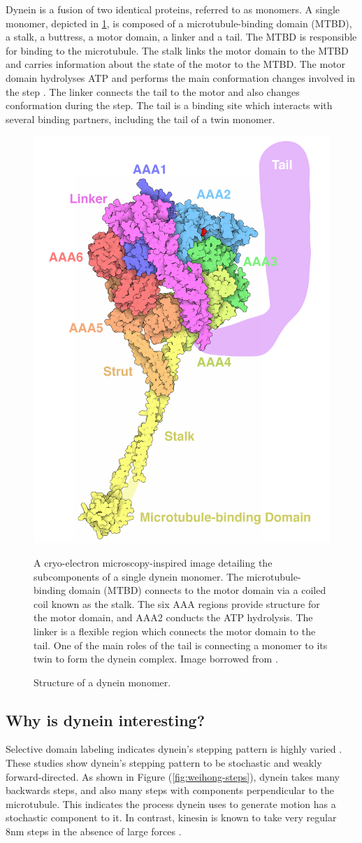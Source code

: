 \documentclass[
11pt, %
english, %
singlespacing, %
headsepline, %
chapterinoneline, %
]{MastersDoctoralThesis} %
\begin{document}
Dynein is a fusion of two identical proteins, referred to as monomers. A single monomer, depicted in \ref{fig:pdb-motm-dynein}, is composed of a microtubule-binding domain (MTBD), a stalk, a buttress, a motor domain, a linker and a tail. The MTBD is responsible for binding to the microtubule. The stalk links the motor domain to the MTBD and carries information about the state of the motor to the MTBD. The motor domain hydrolyses ATP and performs the main conformation changes involved in the step \cite{FRETstatepaper}. The linker connects the tail to the motor and also changes conformation during the step. The tail is a binding site which interacts with several binding partners, including the tail of a twin monomer.\\

\begin{figure}[h]
  \centering
  \includegraphics[width=.5\textwidth,keepaspectratio]{../../figures/pdb-motm-dynein}
  \caption{Structure of a dynein monomer.}{A cryo-electron microscopy-inspired image detailing the subcomponents of a single dynein monomer. The microtubule-binding domain (MTBD) connects to the motor domain via a coiled coil known as the stalk. The six AAA regions provide structure for the motor domain, and AAA2 conducts the ATP hydrolysis. The linker is a flexible region which connects the motor domain to the tail. One of the main roles of the tail is connecting a monomer to its twin to form the dynein complex. Image borrowed from \cite{pdb-motm-dynein}.}
  \label{fig:pdb-motm-dynein}
\end{figure}

\subsection{Why is dynein interesting?}
Selective domain labeling indicates dynein's stepping pattern is highly varied \cite{reck2006single} \cite{weihongpaper}. These studies show dynein's stepping pattern to be stochastic and weakly forward-directed. As shown in Figure (\ref{fig:weihong-steps}), dynein takes many backwards steps, and also many steps with components perpendicular to the microtubule. This indicates the process dynein uses to generate motion has a stochastic component to it. In contrast, kinesin is known to take very regular 8nm steps in the absence of large forces \cite{kinesin-step-size}.\\
\end{document}
